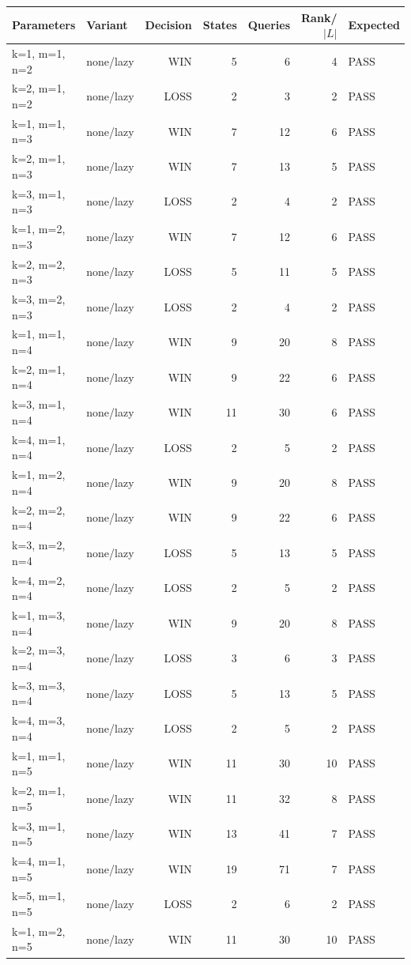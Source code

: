 \begin{longtable}{llrrrrl}
\toprule
Parameters & Variant & Decision & States & Queries & Rank/$|L|$ & Expected \\
\midrule
\endhead
k=1, m=1, n=2 & none/lazy & WIN & 5 & 6 & 4 & PASS \\
k=2, m=1, n=2 & none/lazy & LOSS & 2 & 3 & 2 & PASS \\
k=1, m=1, n=3 & none/lazy & WIN & 7 & 12 & 6 & PASS \\
k=2, m=1, n=3 & none/lazy & WIN & 7 & 13 & 5 & PASS \\
k=3, m=1, n=3 & none/lazy & LOSS & 2 & 4 & 2 & PASS \\
k=1, m=2, n=3 & none/lazy & WIN & 7 & 12 & 6 & PASS \\
k=2, m=2, n=3 & none/lazy & LOSS & 5 & 11 & 5 & PASS \\
k=3, m=2, n=3 & none/lazy & LOSS & 2 & 4 & 2 & PASS \\
k=1, m=1, n=4 & none/lazy & WIN & 9 & 20 & 8 & PASS \\
k=2, m=1, n=4 & none/lazy & WIN & 9 & 22 & 6 & PASS \\
k=3, m=1, n=4 & none/lazy & WIN & 11 & 30 & 6 & PASS \\
k=4, m=1, n=4 & none/lazy & LOSS & 2 & 5 & 2 & PASS \\
k=1, m=2, n=4 & none/lazy & WIN & 9 & 20 & 8 & PASS \\
k=2, m=2, n=4 & none/lazy & WIN & 9 & 22 & 6 & PASS \\
k=3, m=2, n=4 & none/lazy & LOSS & 5 & 13 & 5 & PASS \\
k=4, m=2, n=4 & none/lazy & LOSS & 2 & 5 & 2 & PASS \\
k=1, m=3, n=4 & none/lazy & WIN & 9 & 20 & 8 & PASS \\
k=2, m=3, n=4 & none/lazy & LOSS & 3 & 6 & 3 & PASS \\
k=3, m=3, n=4 & none/lazy & LOSS & 5 & 13 & 5 & PASS \\
k=4, m=3, n=4 & none/lazy & LOSS & 2 & 5 & 2 & PASS \\
k=1, m=1, n=5 & none/lazy & WIN & 11 & 30 & 10 & PASS \\
k=2, m=1, n=5 & none/lazy & WIN & 11 & 32 & 8 & PASS \\
k=3, m=1, n=5 & none/lazy & WIN & 13 & 41 & 7 & PASS \\
k=4, m=1, n=5 & none/lazy & WIN & 19 & 71 & 7 & PASS \\
k=5, m=1, n=5 & none/lazy & LOSS & 2 & 6 & 2 & PASS \\
k=1, m=2, n=5 & none/lazy & WIN & 11 & 30 & 10 & PASS \\

\end{longtable}

